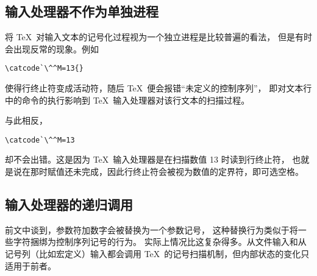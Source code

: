 \documentclass{book}
\begin{document}
\subsection{输入处理器不作为单独进程}

将 \TeX\ 对输入文本的记号化过程视为一个独立进程是比较普遍的看法，
但是有时会出现反常的现象。例如
\begin{verbatim}
\catcode`\^^M=13{}
\end{verbatim}
使得行终止符变成活动符，随后 \TeX\ 便会报错“未定义的控制序列”，
即对文本行中的命令的执行影响到 \TeX\ 输入处理器对该行文本的扫描过程。

与此相反，
\begin{verbatim}
\catcode`\^^M=13
\end{verbatim}
却不会出错。这是因为 \TeX\ 输入处理器是在扫描数值 13 时读到行终止符，
也就是说在那时赋值还未完成，因此行终止符会被视为数值的定界符，即可选空格。

\subsection{输入处理器的递归调用}

前文中谈到，参数符加数字会被替换为一个参数记号，
这种替换行为类似于将一些字符捆绑为控制序列记号的行为。
实际上情况比这复杂得多。从文件输入和从记号列（比如宏定义）输入都会调用
\TeX\ 的记号扫描机制，但内部状态的变化只适用于前者。
\end{document}
